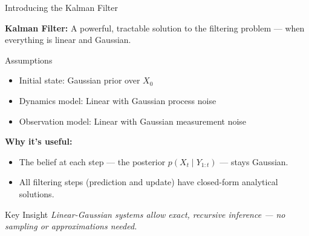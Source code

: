 \documentclass[handout,aspectratio=169]{beamer}
\begin{document}
\begin{frame}{Introducing the Kalman Filter}

\textbf{Kalman Filter:} A powerful, tractable solution to the filtering problem — when everything is linear and Gaussian.


\begin{block}{Assumptions}
\begin{itemize}
  \item Initial state: Gaussian prior over \( X_0 \)
  \item Dynamics model: Linear with Gaussian process noise
  \item Observation model: Linear with Gaussian measurement noise
\end{itemize}
\end{block}


\textbf{Why it's useful:}
\begin{itemize}
  \item The belief at each step — the posterior \( p(X_t \mid Y_{1:t}) \) — stays Gaussian.
  \item All filtering steps (prediction and update) have closed-form analytical solutions.
\end{itemize}


\begin{block}{Key Insight}
\textit{Linear-Gaussian systems allow exact, recursive inference — no sampling or approximations needed.}
\end{block}

\end{frame}














{
	\begin{frame}
	\end{frame}}
\end{document}
